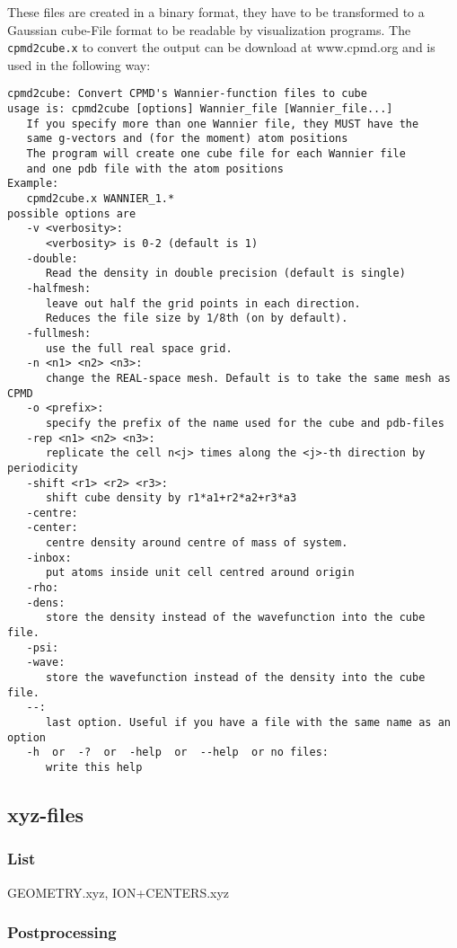 \documentclass[twoside,10pt,titlepage,a4paper]{article}
\begin{document}
These files are created in a binary format, they have to be transformed
to a Gaussian cube-File format to be readable by visualization programs.
The {\tt cpmd2cube.x} to convert the output
can be download at www.cpmd.org and is used in the following way:
\begin{verbatim}
cpmd2cube: Convert CPMD's Wannier-function files to cube
usage is: cpmd2cube [options] Wannier_file [Wannier_file...]
   If you specify more than one Wannier file, they MUST have the
   same g-vectors and (for the moment) atom positions
   The program will create one cube file for each Wannier file
   and one pdb file with the atom positions
Example:
   cpmd2cube.x WANNIER_1.*
possible options are
   -v <verbosity>:
      <verbosity> is 0-2 (default is 1)
   -double:
      Read the density in double precision (default is single)
   -halfmesh:
      leave out half the grid points in each direction.
      Reduces the file size by 1/8th (on by default).
   -fullmesh:
      use the full real space grid.
   -n <n1> <n2> <n3>:
      change the REAL-space mesh. Default is to take the same mesh as CPMD
   -o <prefix>:
      specify the prefix of the name used for the cube and pdb-files
   -rep <n1> <n2> <n3>:
      replicate the cell n<j> times along the <j>-th direction by periodicity
   -shift <r1> <r2> <r3>:
      shift cube density by r1*a1+r2*a2+r3*a3
   -centre:
   -center:
      centre density around centre of mass of system.
   -inbox:
      put atoms inside unit cell centred around origin
   -rho:
   -dens:
      store the density instead of the wavefunction into the cube file.
   -psi:
   -wave:
      store the wavefunction instead of the density into the cube file.
   --:
      last option. Useful if you have a file with the same name as an option
   -h  or  -?  or  -help  or  --help  or no files:
      write this help
\end{verbatim}

\subsection{xyz-files}

\subsubsection{List}

GEOMETRY.xyz, ION+CENTERS.xyz

\subsubsection{Postprocessing}
\end{document}
